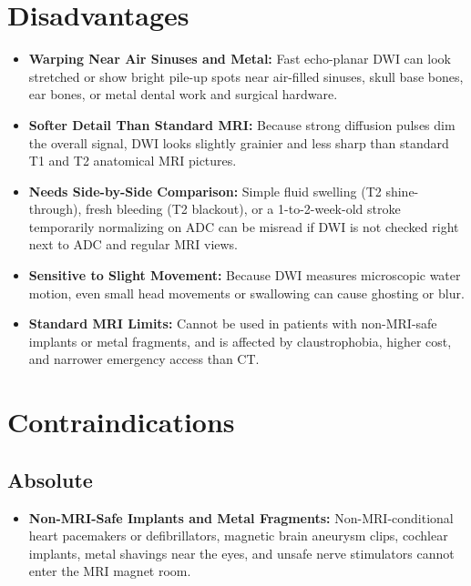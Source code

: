 \section{Disadvantages}
\begin{itemize}
\item \textbf{Warping Near Air Sinuses and Metal:} Fast echo-planar DWI can look stretched or show bright pile-up spots near air-filled sinuses, skull base bones, ear bones, or metal dental work and surgical hardware.
\item \textbf{Softer Detail Than Standard MRI:} Because strong diffusion pulses dim the overall signal, DWI looks slightly grainier and less sharp than standard T1 and T2 anatomical MRI pictures.
\item \textbf{Needs Side-by-Side Comparison:} Simple fluid swelling (T2 shine-through), fresh bleeding (T2 blackout), or a 1-to-2-week-old stroke temporarily normalizing on ADC can be misread if DWI is not checked right next to ADC and regular MRI views.
\item \textbf{Sensitive to Slight Movement:} Because DWI measures microscopic water motion, even small head movements or swallowing can cause ghosting or blur.
\item \textbf{Standard MRI Limits:} Cannot be used in patients with non-MRI-safe implants or metal fragments, and is affected by claustrophobia, higher cost, and narrower emergency access than CT.
\end{itemize}

\section{Contraindications}

\subsection{Absolute}
\begin{itemize}
\item \textbf{Non-MRI-Safe Implants and Metal Fragments:} Non-MRI-conditional heart pacemakers or defibrillators, magnetic brain aneurysm clips, cochlear implants, metal shavings near the eyes, and unsafe nerve stimulators cannot enter the MRI magnet room.
\end{itemize}

